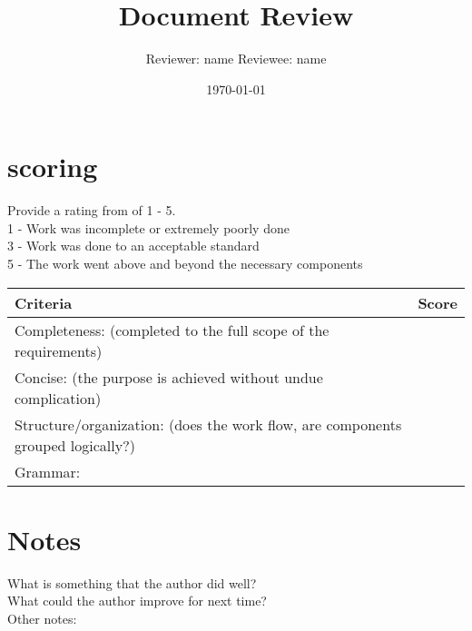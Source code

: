 \documentclass{article}
\title{Document Review}
\author{Reviewer: name Reviewee: name }
\date{\today}
\begin{document}
\maketitle

\section{scoring}
    Provide a rating from of 1 - 5. \\
    1 - Work was incomplete or extremely poorly done\\
    3 - Work was done to an acceptable standard\\
    5 - The work went above and beyond the necessary components\\

\begin{tabular}{|l|c|}
	\hline
	Criteria & Score\\
	\hline
    Completeness:
    (completed to the full scope of the requirements) & \\
	\hline
    Concise:
    (the purpose is achieved without undue complication) & \\
	\hline
    Structure/organization:
    (does the work flow, are components grouped logically?) & \\
    \hline
    Grammar: & \\
    \hline
\end{tabular}

\section{Notes}
    
    What is something that the author did well?\\
    
    What could the author improve for next time?\\
    
    Other notes:\\
\end{document}
